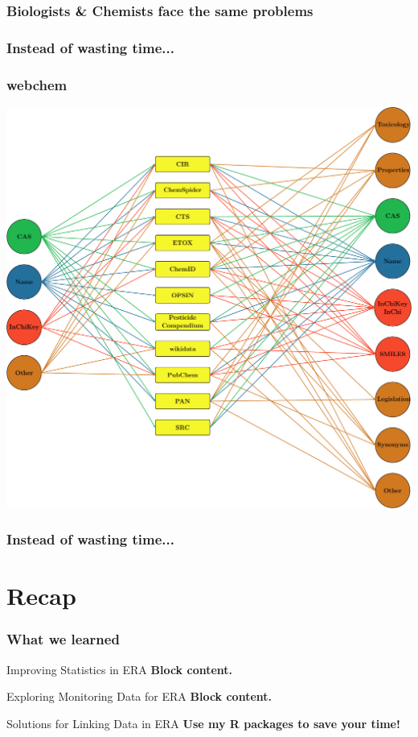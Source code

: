 \documentclass[10pt
	]{beamer}
\begin{document}
\begin{frame}
\frametitle{Biologists \& Chemists face the same problems}

\end{frame}


\begin{frame}
\frametitle{Instead of wasting time...}

\end{frame}

\begin{frame}
\frametitle{webchem}
	\begin{center}
	\includegraphics[width =.7\textwidth]{figs/sources_webchem.pdf} \\
	\end{center}

\end{frame}


\begin{frame}
\frametitle{Instead of wasting time...}

\end{frame}


\section*{Recap}

\begin{frame}
\frametitle{What we learned}
	\begin{exampleblock}{Improving Statistics in ERA}
		\textbf{Block content.}
	\end{exampleblock}

	\begin{exampleblock}{Exploring Monitoring Data for ERA}
		\textbf{Block content.}
	\end{exampleblock}

	\begin{exampleblock}{Solutions for Linking Data in ERA}
		\textbf{Use my R packages to save your time!}
	\end{exampleblock}


\end{frame}
\end{document}
